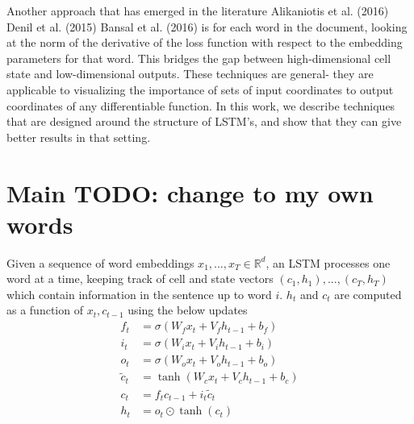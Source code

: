 \documentclass{article}
\begin{document}
Another approach that has emerged in the literature Alikaniotis et al. (2016) Denil et al. (2015) Bansal et al. (2016) is for each word in the document, looking at the norm of the derivative of the loss function with respect to the embedding parameters for that word. This bridges the gap between high-dimensional cell state and low-dimensional outputs. These techniques are general- they are applicable to visualizing the importance of sets of input coordinates to output coordinates of any differentiable function. In this work, we describe techniques that are designed around the structure of LSTM’s, and show that they can give better results in that setting.



\section{Main TODO: change to my own words}

Given a sequence of word embeddings 
$x_1,...,x_T \in \mathbb{R}^d$, an LSTM processes one word at a time, keeping track of cell and state vectors $(c_1, h_1),...,(c_T, h_T)$ 
which contain information in the sentence up to word $i$. $h_t$ and  $c_t$ are computed as a function of $x_t, c_{t - 1}$ using the below updates
\begin{align}
f_t & = \sigma(W_f x_t + V_f h_{t - 1} + b_f) \\
i_t & = \sigma(W_i x_t + V_i h_{t - 1} + b_i) \\
o_t & = \sigma(W_o x_t + V_o h_{t - 1} + b_o) \\
\tilde{c}_t & = \tanh(W_c x_t + V_c h_{t - 1} + b_c) \\
c_t & = f_t c_{t - 1} + i_t \tilde{c}_t \\
h_t & = o_t \odot \tanh(c_t)
\end{align}
\end{document}
